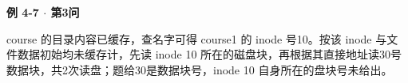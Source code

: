 {\color{ink}\bfseries 例 4-7 \(\cdot \) 第3问}\par\vspace{1bp}course 的目录内容已缓存，查名字可得 course1 的 inode 号10。按该 inode 与文件数据初始均未缓存计，先读 inode 10 所在的磁盘块，再根据其直接地址读30号数据块，共2次读盘；题给30是数据块号，inode 10 自身所在的盘块号未给出。
